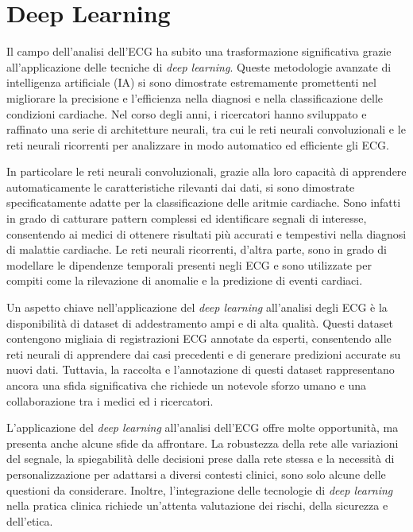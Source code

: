 \documentclass[12pt,italian]{report}
\begin{document}
\section{Deep Learning}
\label{sec:deep}

Il campo dell'analisi dell'ECG ha subito una trasformazione significativa grazie all'applicazione delle tecniche di \textit{deep learning}. Queste metodologie avanzate di intelligenza artificiale (IA) si sono dimostrate estremamente promettenti nel migliorare la precisione e l'efficienza nella diagnosi e nella classificazione delle condizioni cardiache. Nel corso degli anni, i ricercatori hanno sviluppato e raffinato una serie di architetture neurali, tra cui le reti neurali convoluzionali e le reti neurali ricorrenti per analizzare in modo automatico ed efficiente gli ECG.

In particolare le reti neurali convoluzionali, grazie alla loro capacità di apprendere automaticamente le caratteristiche rilevanti dai dati, si sono dimostrate specificatamente adatte per la classificazione delle aritmie cardiache. Sono infatti in grado di catturare pattern complessi ed identificare segnali di interesse, consentendo ai medici di ottenere risultati più accurati e tempestivi nella diagnosi di malattie cardiache. Le reti neurali ricorrenti, d'altra parte, sono in grado di modellare le dipendenze temporali presenti negli ECG e sono utilizzate per compiti come la rilevazione di anomalie e la predizione di eventi cardiaci.

Un aspetto chiave nell'applicazione del \textit{deep learning} all'analisi degli ECG è la disponibilità di dataset di addestramento ampi e di alta qualità. Questi dataset contengono migliaia di registrazioni ECG annotate da esperti, consentendo alle reti neurali di apprendere dai casi precedenti e di generare predizioni accurate su nuovi dati. Tuttavia, la raccolta e l'annotazione di questi dataset rappresentano ancora una sfida significativa che richiede un notevole sforzo umano e una collaborazione tra i medici ed i ricercatori.

L'applicazione del \textit{deep learning} all'analisi dell'ECG offre molte opportunità, ma presenta anche alcune sfide da affrontare. La robustezza della rete alle variazioni del segnale, la spiegabilità delle decisioni prese dalla rete stessa e la necessità di personalizzazione per adattarsi a diversi contesti clinici, sono solo alcune delle questioni da considerare. Inoltre, l'integrazione delle tecnologie di \textit{deep learning} nella pratica clinica richiede un'attenta valutazione dei rischi, della sicurezza e dell'etica.
\end{document}
